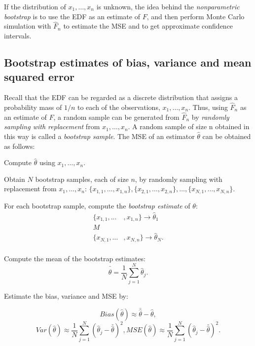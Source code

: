 If the distribution of $x_1,\ldots,x_n$ is unknown, the idea behind the {\it nonparametric bootstrap} is to use the EDF as an estimate of $F$, and then perform Monte Carlo simulation with $\hat{F}_n$ to estimate the MSE and to get approximate confidence intervals.

\subsection{Bootstrap estimates of bias, variance and mean squared error}
\work
Recall that the EDF can be regarded as a discrete distribution that assigns a probability mass of $1/n$ to each of the observations, $x_1,\ldots,x_n$. Thus, using $\hat{F}_n$ as an estimate of $F$, a random sample can be generated from $\hat{F}_n$ by {\it randomly sampling with replacement} from $x_1,\ldots,x_n$. A random sample of size n obtained in this way is called a {\it bootstrap sample}. The MSE of an estimator $\hat{\theta}$ can be obtained as follows:
\begin{asparaenum}[(a)]
\item Compute $\hat{\theta}$ using $x_1,\ldots,x_n$.

\item Obtain $N$ bootstrap samples, each of size $n$, by randomly sampling with replacement from $x_1,\ldots,x_n$: $\{x_{1,1},\ldots,x_{1,n}\},\{x_{2,1},\ldots,x_{2,n}\},\ldots,\{x_{N,1},\ldots,x_{N,n}\}$.

\item	For each bootstrap sample, compute the {\it bootstrap estimate} of $\theta$:
\begin{displaymath}
\begin{split}
\{x_{1,1},\ldots&,x_{1,n}\}\rightarrow\hat{\theta}_1\\
M&\\
\{x_{N,1},\ldots&,x_{N,n}\}\rightarrow\hat{\theta}_N.\\
\end{split}
\end{displaymath}
  
\item	Compute the mean of the bootstrap estimates:
\begin{equation}
\bar{\hat{\theta}}=\frac{1}{N}\sum^N_{j=1}\hat{\theta}_j.
\end{equation}
\item	Estimate the bias, variance and MSE by:

\begin{equation}
Bias(\hat{\theta})\approx \bar{\hat{\theta}}-\hat{\theta},
\end{equation}
\begin{equation}
Var(\hat{\theta})\approx \frac{1}{N}\sum^N_{j=1}(\hat{\theta}_j-\bar{\hat{\theta}})^2,
MSE(\hat{\theta})\approx \frac{1}{N}\sum^N_{j=1}(\hat{\theta}_j-\bar{\hat{\theta}})^2.
\end{equation}


\end{asparaenum}

